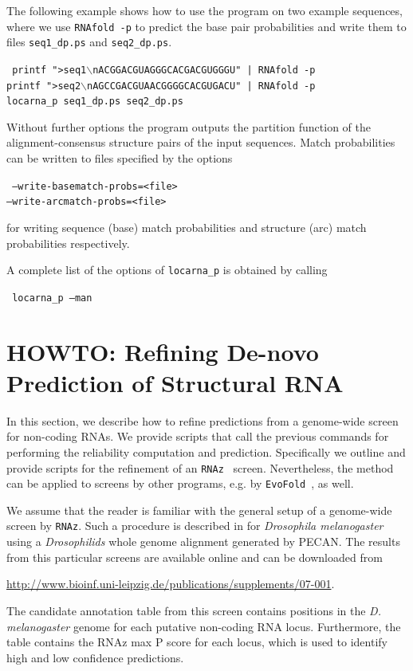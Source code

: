 \documentclass{article}
\newenvironment{ttbox}{%
  \begin{framed}\begin{minipage}{1.0\textwidth}\tt}%
{\end{minipage}\end{framed}\noindent}
\begin{document}
The following example shows how to use the program on two example
sequences, where we use \texttt{RNAfold -p} to predict the base pair
probabilities and write them to files \texttt{seq1\_dp.ps} and \texttt{seq2\_dp.ps}.
\begin{ttbox}
  printf ">seq1$\backslash{}$nACGGACGUAGGGCACGACGUGGGU" |  RNAfold -p\\
  printf ">seq2$\backslash{}$nAGCCGACGUAACGGGGCACGUGACU" |  RNAfold -p\\
  locarna\_p seq1\_dp.ps seq2\_dp.ps
\end{ttbox}
Without further options the program outputs the partition function of
the alignment-consensus structure pairs of the input sequences.
%
Match probabilities can be written to files specified by the options
\begin{ttbox}
--write-basematch-probs=<file>\\
--write-arcmatch-probs=<file>
\end{ttbox}
for writing sequence (base) match probabilities and structure (arc) match probabilities respectively.

A complete list of the options of \texttt{locarna\_p} is obtained by calling
\begin{ttbox}
  locarna\_p --man
\end{ttbox}

\section{HOWTO: Refining De-novo Prediction of Structural RNA}

In this section, we describe how to refine predictions from a
genome-wide screen for non-coding RNAs. We provide scripts that call
the previous commands for performing the reliability computation and
prediction. Specifically we outline and provide scripts for the
refinement of an
\texttt{RNAz}~\cite{Washietl:Hofacker:Stadler:Fast_and_relia:PNAS2005,Washietl:Hofacker:Lukasser:Mappi_conse_RNA:2005}
screen. Nevertheless, the method can be applied to screens by other
programs, e.g. by
\texttt{EvoFold}~\cite{Pedersen:Bejerano:Siepel:Ident_and_Class:2006},
as well.

We assume that the reader is familiar with the general setup of a
genome-wide screen by \texttt{RNAz}. Such a procedure is described in
\cite{Rose:Hackermuller:Washietl:Compu_RNomi_droso:2007} for
\emph{Drosophila melanogaster} using a \emph{Drosophilids} whole
genome alignment generated by PECAN. The results from this particular
screens are available online and can be downloaded from
\begin{center}
  \url{http://www.bioinf.uni-leipzig.de/publications/supplements/07-001}.
\end{center}
The candidate annotation table from this screen contains positions in
the \emph{D. melanogaster} genome for each putative non-coding RNA
locus. Furthermore, the table contains the RNAz max P score for each
locus, which is used to identify high and low confidence predictions.
\end{document}
